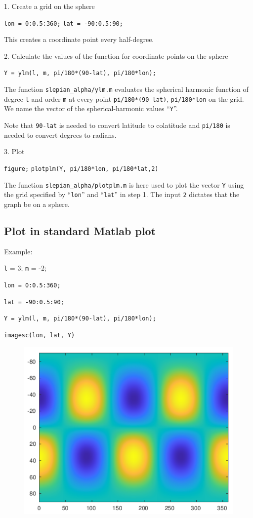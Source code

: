 \documentclass{article}
\begin{document}
\setlength{\parskip}{0.5cm plus4mm minus3mm}

1. Create a grid on the sphere

\verb+lon = 0:0.5:360;+
\verb+lat = -90:0.5:90;+

This creates a coordinate point every half-degree.

2. Calculate the values of the function for coordinate points on the sphere

\verb+Y = ylm(l, m, pi/180*(90-lat), pi/180*lon);+

The function \verb+slepian_alpha/ylm.m+ evaluates the spherical harmonic function of degree \verb+l+ and order \verb+m+ at every point \verb+pi/180*(90-lat)+, \verb+pi/180*lon+ on the grid. We name the vector of the spherical-harmonic values “\verb+Y+”.

Note that \verb+90-lat+ is needed to convert latitude to colatitude and \verb+pi/180+ is needed to convert degrees to radians.

3. Plot

\verb+figure;+
\verb+plotplm(Y, pi/180*lon, pi/180*lat,2)+

The function \verb+slepian_alpha/plotplm.m+ is here used to plot the vector \verb+Y+ using the grid specified by “\verb+lon+” and “\verb+lat+” in step 1. The input \verb+2+ dictates that the graph be on a sphere.

\subsection{Plot in standard Matlab plot}

Example:
\vspace{2mm}

\setlength{\parskip}{.1mm}

\verb+l+ = 3; \verb+m+ = -2;

\verb+lon = 0:0.5:360;+

\verb+lat = -90:0.5:90;+

\verb+Y = ylm(l, m, pi/180*(90-lat), pi/180*lon);+

\verb+imagesc(lon, lat, Y)+

\begin{figure}[H]
\includegraphics[scale=.6]{standard_matlab_plot}
\end{figure}
\end{document}
